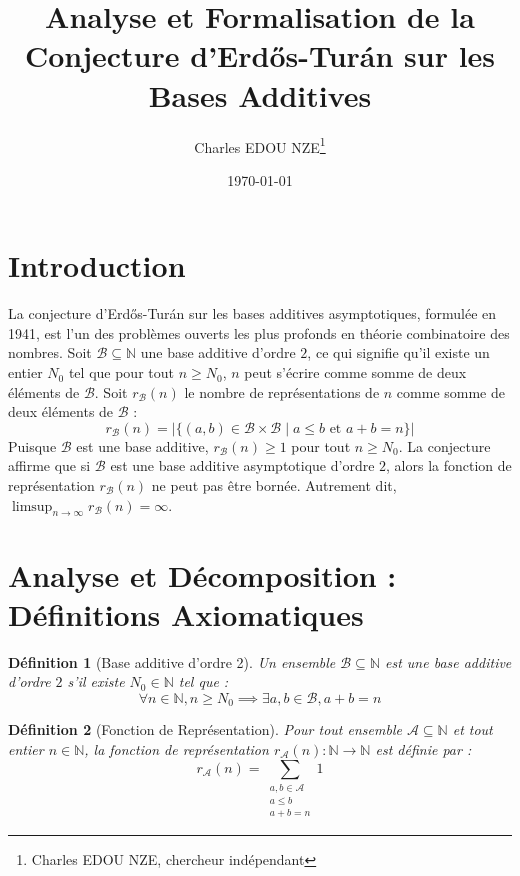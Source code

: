 \documentclass[11pt,a4paper]{article}
\title{Analyse et Formalisation de la Conjecture d'Erd\H{o}s-Tur\'{a}n sur les Bases Additives}
\author{Charles EDOU NZE\thanks{Charles EDOU NZE, chercheur indépendant}}
\date{\today}
\newtheorem{definition}{Définition}
\begin{document}
\maketitle
\tableofcontents
\newpage

\section{Introduction}

La conjecture d'Erd\H{o}s-Tur\'{a}n sur les bases additives asymptotiques, formulée en 1941, est l'un des problèmes ouverts les plus profonds en théorie combinatoire des nombres.
Soit $\mathcal{B} \subseteq \mathbb{N}$ une base additive d'ordre $2$, ce qui signifie qu'il existe un entier $N_0$ tel que pour tout $n \geq N_0$, $n$ peut s'écrire comme somme de deux éléments de $\mathcal{B}$.
Soit $r_{\mathcal{B}}(n)$ le nombre de représentations de $n$ comme somme de deux éléments de $\mathcal{B}$ :
$$ r_{\mathcal{B}}(n) = \left| \{ (a, b) \in \mathcal{B} \times \mathcal{B} \mid a \leq b \text{ et } a + b = n \} \right| $$
Puisque $\mathcal{B}$ est une base additive, $r_{\mathcal{B}}(n) \geq 1$ pour tout $n \geq N_0$.
La conjecture affirme que si $\mathcal{B}$ est une base additive asymptotique d'ordre $2$, alors la fonction de représentation $r_{\mathcal{B}}(n)$ ne peut pas être bornée.
Autrement dit, $\limsup_{n \to \infty} r_{\mathcal{B}}(n) = \infty$.

\section{Analyse et Décomposition : Définitions Axiomatiques}

\begin{definition}[Base additive d'ordre 2]
Un ensemble $\mathcal{B} \subseteq \mathbb{N}$ est une base additive d'ordre $2$ s'il existe $N_0 \in \mathbb{N}$ tel que :
$$ \forall n \in \mathbb{N}, n \geq N_0 \implies \exists a, b \in \mathcal{B}, a + b = n $$
\end{definition}

\begin{definition}[Fonction de Représentation]
Pour tout ensemble $\mathcal{A} \subseteq \mathbb{N}$ et tout entier $n \in \mathbb{N}$, la fonction de représentation $r_{\mathcal{A}}(n) : \mathbb{N} \to \mathbb{N}$ est définie par :
$$ r_{\mathcal{A}}(n) = \sum_{\substack{a, b \in \mathcal{A} \\ a \leq b \\ a + b = n}} 1 $$
\end{definition}
\end{document}
